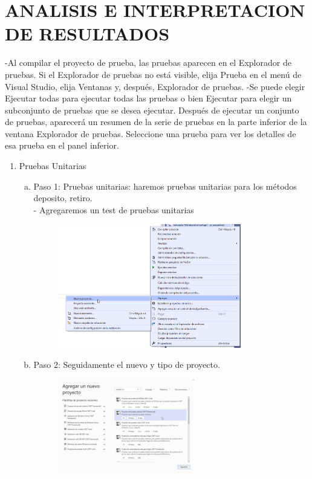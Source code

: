 \section{ANALISIS E INTERPRETACION DE RESULTADOS} 
-Al compilar el proyecto de prueba, las pruebas aparecen en el Explorador de pruebas. Si el Explorador de pruebas no está visible, elija Prueba en el menú de Visual Studio, elija Ventanas y, después, Explorador de pruebas.
-Se puede elegir Ejecutar todas para ejecutar todas las pruebas o bien Ejecutar para elegir un subconjunto de pruebas que se desea ejecutar. Después de ejecutar un conjunto de pruebas, aparecerá un resumen de la serie de pruebas en la parte inferior de la ventana Explorador de pruebas. Seleccione una prueba para ver los detalles de esa prueba en el panel inferior. 
\begin{enumerate}[1.]
	\item Pruebas Unitarias
	\begin{enumerate}[a)]
	\item Paso 1: Pruebas unitarias: haremos pruebas unitarias para los métodos deposito, retiro.\\
		-  Agregaremos un test de pruebas unitarias
		\begin{figure}[H]
		\begin{center}
		\includegraphics[width=8cm]{./Imagenes/imp1}
		\end{center}
		\end{figure}
	\item Paso 2: Seguidamente el nuevo y tipo de proyecto.
		\begin{figure}[H]
		\begin{center}
		\includegraphics[width=6cm]{./Imagenes/imp2}

\end{center}
\end{figure}
\end{enumerate}
\end{enumerate}
